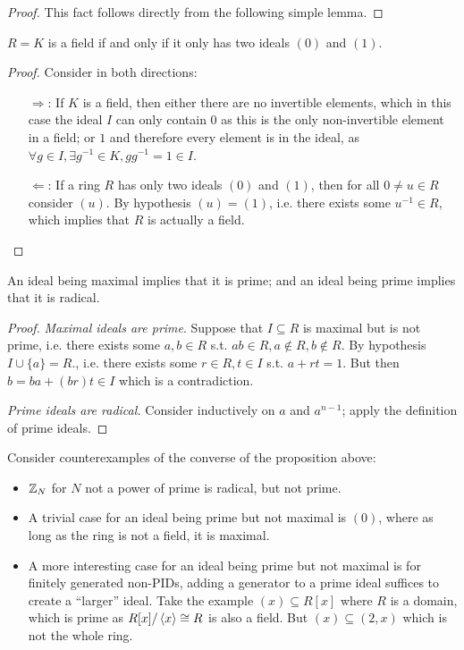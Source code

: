 \begin{proof}
    This fact follows directly from the following simple lemma.
\end{proof}

\begin{lemma}
    $R = K$ is a field if and only if it only has two ideals $(0)$ and $(1)$.
\end{lemma}

\begin{proof}
    Consider in both directions:
    \begin{itemize}
        \item[$\Rightarrow$:] If $K$ is a field, then either there are no invertible elements, which in this case the ideal $I$ can only contain 0 as this is the only non-invertible element in a field; or $1$ and therefore every element is in the ideal, as $\forall g\in I, \exists g^{-1} \in K, gg^{-1} = 1 \in I$.
        \item[$\Leftarrow$:] If a ring $R$ has only two ideals $(0)$ and $(1)$, then for all $0\neq u\in R$ consider $(u)$. By hypothesis $(u) = (1)$, i.e. there exists some $u^{-1}\in R$, which implies that $R$ is actually a field.
    \end{itemize} 
\end{proof}

\begin{proposition}
    An ideal being maximal implies that it is prime; and an ideal being prime implies that it is radical. 
\end{proposition}

\begin{proof} 
   \emph{Maximal ideals are prime}. Suppose that $I \subseteq R$ is maximal but is not prime, i.e. there exists some $a, b\in R$ s.t. $ab\in R, a\notin R, b\notin R$. By hypothesis $I \cup \{a\} = R$., i.e. there exists some $r\in R, t\in I$ s.t. $a + rt = 1$. But then $b = ba + (br)t \in I$ which is a contradiction.

   \emph{Prime ideals are radical.} Consider inductively on $a$ and $a^{n-1}$; apply the definition of prime ideals.
\end{proof}

\begin{example}
    Consider counterexamples of the converse of the proposition above:
    \begin{itemize}
        \item $\mathbb{Z}_N$ for $N$ not a power of prime is radical, but not prime.
        \item A trivial case for an ideal being prime but not maximal is $(0)$, where as long as the ring is not a field, it is maximal.
        \item A more interesting case for an ideal being prime but not maximal is for finitely generated non-PIDs, adding a generator to a prime ideal suffices to create a ``larger'' ideal. Take the example $(x) \subseteq R[x]$ where $R$ is a domain, which is prime as $R[x]/\left\langle x \right\rangle \cong R$ is also a field. But $(x) \subseteq (2, x)$ which is not the whole ring.
    \end{itemize}
\end{example}

